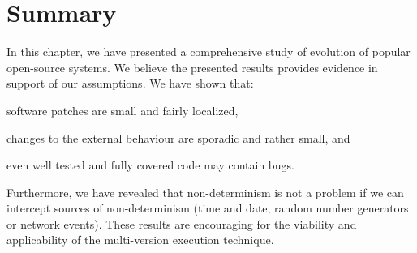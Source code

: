 \section{Summary}
\label{evolution:summary}

In this chapter, we have presented a comprehensive study of evolution of
\numSystems popular open-source systems. We believe the presented results
provides evidence in support of our assumptions. We have shown that:%
\begin{inparaenum}[(1)]
\item software patches are small and fairly localized,
\item changes to the external behaviour are sporadic and rather small, and
\item even well tested and fully covered code may contain bugs.
\end{inparaenum}
Furthermore, we have revealed that non-determinism is not a problem if we can
intercept sources of non-determinism (\eg time and date, random number
generators or network events). These results are encouraging for the viability
and applicability of the multi-version execution technique.

